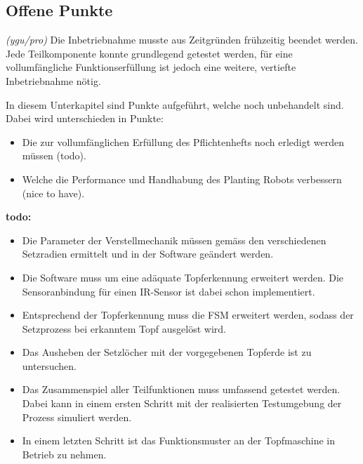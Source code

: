 \subsection{Offene Punkte}
\textit{(ygu/pro)} Die Inbetriebnahme musste aus Zeitgründen frühzeitig beendet werden. Jede Teilkomponente konnte grundlegend getestet werden, für eine vollumfängliche Funktionserfüllung ist jedoch eine weitere, vertiefte Inbetriebnahme nötig.
\newline

In diesem Unterkapitel sind Punkte aufgeführt, welche noch unbehandelt sind. Dabei wird unterschieden in Punkte:
\begin{itemize}
	\item Die zur vollumfänglichen Erfüllung des Pflichtenhefts noch erledigt werden müssen (todo). 
	
	\item Welche die Performance und Handhabung des Planting Robots verbessern (nice to have). 
\end{itemize}

\textbf{todo:}
\begin{itemize}
	\item Die Parameter der Verstellmechanik müssen gemäss den verschiedenen Setzradien ermittelt und in der Software geändert werden.
	\item Die Software muss um eine adäquate Topferkennung erweitert werden. Die Sensoranbindung für einen IR-Sensor ist dabei schon implementiert.
	\item Entsprechend der Topferkennung muss die FSM erweitert werden, sodass der Setzprozess bei erkanntem Topf ausgelöst wird.
	
	\item Das Ausheben der Setzlöcher mit der vorgegebenen Topferde ist zu untersuchen.
	
	\item Das Zusammenspiel aller Teilfunktionen muss umfassend getestet werden. Dabei kann in einem ersten Schritt mit der realisierten Testumgebung der Prozess simuliert werden.
	
	\item In einem letzten Schritt ist das Funktionsmuster an der Topfmaschine in Betrieb zu nehmen.
\end{itemize}

